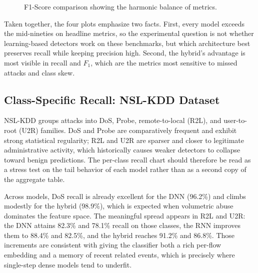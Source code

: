 \documentclass[10pt, conference, compsocconf, letterpaper, twocolumn, twoside]{IEEEtran}
\begin{document}
\begin{figure}[h]
\centering
{}
\caption{F1-Score comparison showing the harmonic balance of metrics.}
\end{figure}

Taken together, the four plots emphasize two facts. First, every model exceeds the mid-nineties on headline metrics, so the experimental question is not whether learning-based detectors work on these benchmarks, but which architecture best preserves recall while keeping precision high. Second, the hybrid's advantage is most visible in recall and $F_1$, which are the metrics most sensitive to missed attacks and class skew.

\subsection{Class-Specific Recall: NSL-KDD Dataset}
NSL-KDD groups attacks into DoS, Probe, remote-to-local (R2L), and user-to-root (U2R) families. DoS and Probe are comparatively frequent and exhibit strong statistical regularity; R2L and U2R are sparser and closer to legitimate administrative activity, which historically causes weaker detectors to collapse toward benign predictions. The per-class recall chart should therefore be read as a stress test on the tail behavior of each model rather than as a second copy of the aggregate table.

Across models, DoS recall is already excellent for the DNN (96.2\%) and climbs modestly for the hybrid (98.9\%), which is expected when volumetric abuse dominates the feature space. The meaningful spread appears in R2L and U2R: the DNN attains 82.3\% and 78.1\% recall on those classes, the RNN improves them to 88.4\% and 82.5\%, and the hybrid reaches 91.2\% and 86.8\%. Those increments are consistent with giving the classifier both a rich per-flow embedding and a memory of recent related events, which is precisely where single-step dense models tend to underfit.
\end{document}
